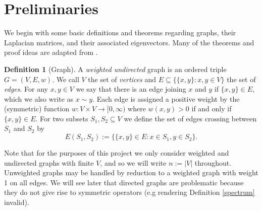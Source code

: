 \documentclass[a4paper,11pt]{article}
\theoremstyle{definition}
\newtheorem{definition}[theorem]{Definition}
\begin{document}

\section{Preliminaries}
We begin with some basic definitions and theorems regarding graphs, their Laplacian matrices, and their associated eigenvectors. Many of the theorems and proof ideas are adapted from \cite{book}.

\begin{definition}[Graph]
A \emph{weighted undirected} graph is an ordered triple $G = (V, E, w)$. We call $V$ the set of \emph{vertices} and $E \subseteq \{ \{x, y\} : x, y \in V \}$ the set of \emph{edges}. For any $x, y \in V$ we say that there is an edge joining $x$ and $y$ if $\{x, y\} \in E$, which we also write as $x \sim y$. Each edge is assigned a positive weight by the (symmetric) function $w: V \times V \to [0, \infty)$ where $w(x, y) > 0$ if and only if $\{x, y\} \in E$. For two subsets $S_1, S_2 \subseteq V$ we define the set of edges crossing between $S_1$ and $S_2$ by
\[
E(S_1, S_2) := \{ \{x, y\} \in E : x \in S_1, y \in S_2 \}.
\]
\end{definition}

Note that for the purposes of this project we only consider weighted and undirected graphs with finite $V$, and so we will write $n := |V|$ throughout. Unweighted graphs may be handled by reduction to a weighted graph with weight 1 on all edges. We will see later that directed graphs are problematic because they do not give rise to symmetric operators (e.g rendering Definition \ref{spectrum} invalid).
\end{document}
